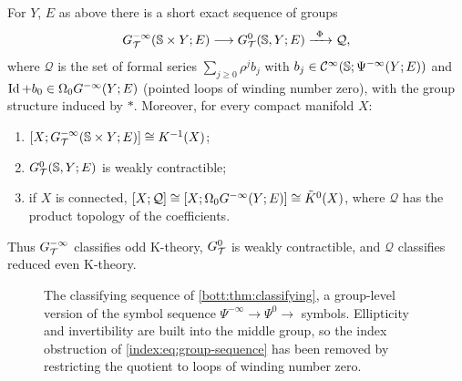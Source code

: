 \begin{theorem}\label{bott:thm:classifying}
  For $Y$, $E$ as above there is a short exact sequence of groups
  \begin{equation}\label{bott:eq:classifying}
    G^{-\infty}_{\mathcal{T}}(\mathbb{S}\times Y;E)\longrightarrow G^{0}_{\mathcal{T}}(\mathbb{S},Y;E)\xrightarrow{\ \Phi\ }\mathcal Q,
  \end{equation}
  where $\mathcal Q$ is the set of formal series $\sum_{j\ge0}\rho^jb_j$ with
  $b_j\in\mathcal{C}^\infty(\mathbb{S};\Psi^{-\infty}(Y;E))$ and $\operatorname{Id}+b_0\in\Omega_0G^{-\infty}(Y;E)$ (pointed loops of
  winding number zero), with the group structure induced by $*$. Moreover, for every compact
  manifold $X$:
  \begin{enumerate}[label=(\roman*)]
  \item $[X;G^{-\infty}_{\mathcal{T}}(\mathbb{S}\times Y;E)]\cong K^{-1}(X)$;
  \item $G^{0}_{\mathcal{T}}(\mathbb{S},Y;E)$ is weakly contractible;
  \item if $X$ is connected, $[X;\mathcal Q]\cong[X;\Omega_0G^{-\infty}(Y;E)]\cong\tilde K^0(X)$,
    where $\mathcal Q$ has the product topology of the coefficients.
  \end{enumerate}
  Thus $G^{-\infty}_{\mathcal{T}}$ classifies odd K-theory, $G^{0}_{\mathcal{T}}$ is weakly contractible, and $\mathcal Q$
  classifies reduced even K-theory.
\end{theorem}

\begin{figure}[ht]
\centering
{}
\caption{The classifying sequence of \cref{bott:thm:classifying}, a group-level
version of the symbol sequence $\Psi^{-\infty}\to\Psi^0\to$ symbols. Ellipticity
and invertibility are built into the middle group, so the index obstruction of
\eqref{index:eq:group-sequence} has been removed by restricting the quotient to
loops of winding number zero.}
\label{bott:fig:classifying}
\end{figure}

